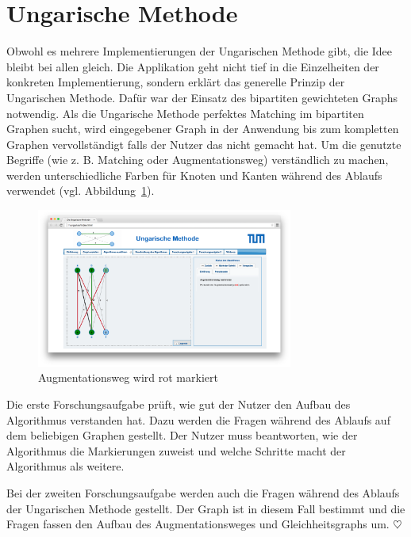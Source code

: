 \section{Ungarische Methode} %
Obwohl es mehrere Implementierungen der Ungarischen Methode gibt, die Idee bleibt bei allen gleich. Die Applikation geht nicht tief in die Einzelheiten der konkreten Implementierung, sondern erklärt das generelle Prinzip der Ungarischen Methode. Dafür war der Einsatz des bipartiten gewichteten Graphs notwendig. Als die Ungarische Methode perfektes Matching im bipartiten Graphen sucht, wird eingegebener Graph in der Anwendung bis zum kompletten Graphen vervollständigt falls der Nutzer das nicht gemacht hat. Um die genutzte Begriffe (wie z. B. Matching oder Augmentationsweg) verständlich zu machen, werden unterschiedliche Farben für Knoten und Kanten während des Ablaufs verwendet (vgl. Abbildung~\ref{fig:hungarian-colors}).
\begin{figure}[h!]
	\centering
	\includegraphics[width=0.75\textwidth]{figures/hungarian-colors}
	\caption[Ungarische Methode: Augmentationsweg]{Augmentationsweg wird rot markiert}\label{fig:hungarian-colors}
\end{figure}

Die erste Forschungsaufgabe prüft, wie gut der Nutzer den Aufbau des Algorithmus verstanden hat. Dazu werden die Fragen während des Ablaufs auf dem beliebigen Graphen gestellt. Der Nutzer muss beantworten, wie der Algorithmus die Markierungen zuweist und welche Schritte macht der Algorithmus als weitere. 

Bei der zweiten Forschungsaufgabe werden auch die Fragen während des Ablaufs der Ungarischen Methode gestellt. Der Graph ist in diesem Fall bestimmt und die Fragen fassen den Aufbau des Augmentationsweges und Gleichheitsgraphs um. \hfill$\heartsuit$

